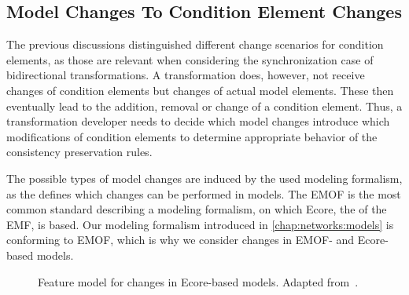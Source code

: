 

\subsection{Model Changes To Condition Element Changes}
\label{chap:synchronization:achieving:changes}

The previous discussions distinguished different change scenarios for condition elements, as those are relevant when considering the synchronization case of bidirectional transformations.
A transformation does, however, not receive changes of condition elements but changes of actual model elements.
These then eventually lead to the addition, removal or change of a condition element.
Thus, a transformation developer needs to decide which model changes introduce which modifications of condition elements to determine appropriate behavior of the consistency preservation rules.

The possible types of model changes are induced by the used modeling formalism, as the \metametamodel defines which changes can be performed in models.
The \gls{EMOF} is the most common standard describing a modeling formalism, on which Ecore, the \metametamodel of the \gls{EMF}, is based.
Our modeling formalism introduced in \autoref{chap:networks:models} is conforming to \gls{EMOF}, which is why we consider changes in \gls{EMOF}- and Ecore-based models.


\begin{figure}
    \centering
    
    \caption[Feature model for changes in Ecore-based models]{Feature model for changes in Ecore-based models. Adapted from~\cite[Fig.~5.3]{kramer2017a}.}
    \label{fig:synchronization:change_feature_model}
\end{figure}

